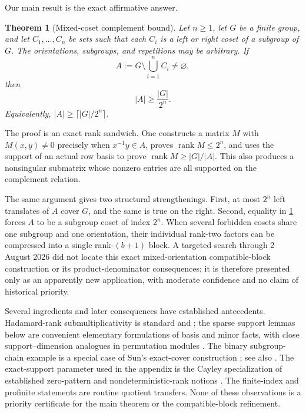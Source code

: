 \documentclass[11pt,a4paper]{amsart}
\newtheorem{theorem}{Theorem}[section]
\theoremstyle{definition}
\theoremstyle{remark}
\newcommand{\rank}{\operatorname{rank}}
\begin{document}
Our main result is the exact affirmative answer.

\begin{theorem}[Mixed-coset complement bound]\label{thm:main}
Let $n\ge 1$, let $G$ be a finite group, and let $C_1,\ldots,C_n$ be sets such
that each $C_i$ is a left or right coset of a subgroup of $G$.  The orientations,
subgroups, and repetitions may be arbitrary.  If
\[
  A:=G\setminus\bigcup_{i=1}^n C_i\ne\varnothing,
\]
then
\[
  |A|\ge \frac{|G|}{2^n}.
\]
Equivalently, $|A|\ge\lceil |G|/2^n\rceil$.
\end{theorem}

The proof is an exact rank sandwich.  One constructs a matrix $M$ with
$M(x,y)\ne0$ precisely when $x^{-1}y\in A$, proves $\rank M\le2^n$, and uses
the support of an actual row basis to prove $\rank M\ge |G|/|A|$.  This also
produces a nonsingular submatrix whose nonzero entries are all supported on the
complement relation.

The same argument gives two structural strengthenings.  First, at most $2^n$
left translates of $A$ cover $G$, and the same is true on the right.  Second,
equality in \cref{thm:main} forces $A$ to be a subgroup coset of index $2^n$.
When several forbidden cosets share one subgroup and one orientation, their
individual rank-two factors can be compressed into a single rank-$(b+1)$
block.  A targeted search through 2 August 2026 did not locate this exact
mixed-orientation compatible-block construction or its product-denominator
consequences; it is therefore presented only as an apparently new application,
with moderate confidence and no claim of historical priority.

Several ingredients and later consequences have established antecedents.
Hadamard-rank submultiplicativity is standard
\cite[Observation~7, p.~587]{Johnson1978} and \cite[Proposition~2, p.~27]{ArvindJoglekarSrinivasan2009}; the sparse
support lemmas below are convenient elementary formulations of basis and minor
facts, with close support--dimension analogues in permutation modules
\cite{GoldsteinGuralnickIsaacs2005}.  The binary subgroup-chain example is a
special case of Sun's exact-cover construction \cite[Example~1.2]{Sun2001}; see also \cite{Sun2006}.
The exact-support parameter used in the appendix is the Cayley specialization
of established zero-pattern and nondeterministic-rank notions
\cite{HershkowitzSchneider1993,DeWolf2000}.  The finite-index and profinite
statements are routine quotient transfers.  None of these observations is a
priority certificate for the main theorem or the compatible-block refinement.
\end{document}
